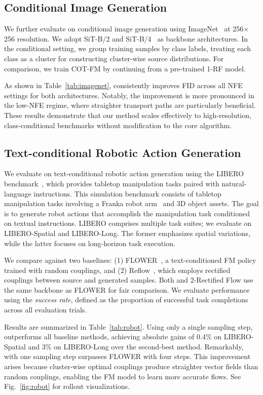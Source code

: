 \subsection{Conditional Image Generation}
We further evaluate \method{} on conditional image generation using ImageNet~\cite{deng2009imagenet} at 256$\times$256 resolution. We adopt SiT-B/2 and SiT-B/4~\cite{ma2024sit} as backbone architectures. In the conditional setting, we group training samples by class labels, treating each class as a cluster for constructing cluster-wise source distributions. For comparison, we train COT-FM by continuing from a pre-trained 1-RF model.

As shown in Table~\ref{tab:imagenet}, \method{} consistently improves FID across all NFE settings for both architectures. Notably, the improvement is more pronounced in the low-NFE regime, where straighter transport paths are particularly beneficial. These results demonstrate that our method scales effectively
to high-resolution, class-conditional benchmarks without modification to the core algorithm.

\subsection{Text-conditional Robotic Action Generation}
We evaluate \method{} on text-conditional robotic action generation using the LIBERO benchmark~\cite{liu2023libero}, which provides tabletop manipulation tasks paired with natural-language instructions. This simulation benchmark consists of tabletop manipulation tasks involving a Franka robot arm~\cite{gaz2019dynamic} and 3D object assets. The goal is to generate robot actions that accomplish the manipulation task conditioned on textual instructions. LIBERO comprises multiple task suites; we evaluate on LIBERO-Spatial and LIBERO-Long. The former emphasizes spatial variations, while the latter focuses on long-horizon task execution.

We compare against two baselines: (1) FLOWER~\cite{reuss2025flower}, a text-conditioned FM policy trained with random couplings, and (2) Reflow~\cite{liu2022flow}, which employs rectified couplings between source and generated samples.  Both \method{} and 2-Rectified Flow use the same backbone as FLOWER for fair comparison.  We evaluate performance using the \textit{success rate}, defined as the proportion of successful task completions across all evaluation trials.

Results are summarized in Table~\ref{tab:robot}. Using only a single sampling step, \method{} outperforms all baseline methods, achieving absolute gains of 0.4\% on LIBERO-Spatial and 3\% on LIBERO-Long over the second-best method. Remarkably, \method{} with one sampling step surpasses FLOWER with four steps. This improvement arises because cluster-wise optimal couplings produce straighter vector fields than random couplings, enabling the FM model to learn more accurate flows. See Fig.~\ref{fig:robot} for rollout visualizations.


